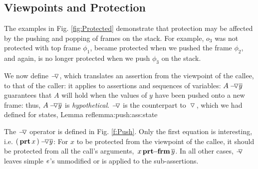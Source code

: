 { 
   
 \subsection{Viewpoints and Protection}
 
 
{The examples in Fig. \ref{fig:Protected} demonstrate that %
 protection may be affected by the pushing and popping of frames on the stack. For example, $o_3$ was not protected with top frame $\phi_1$,   became protected when we pushed the frame $\phi_2$,  and again, is no longer protected when we push $\phi_3$ on the stack. 
 
We now define 
$\pushSymbolAA$, which translates an assertion from the viewpoint of the callee, to that of the caller:
it applies to assertions and sequences of variables:  $\PushAS y A$   guarantees that $A$ will hold when the values of $y$ have been pushed onto a new frame:
 thus, $\PushAS y A$ is \emph{hypothetical}.
$\pushSymbolAA$ is the counterpart to $\pushSymbol$, which we had defined for states, \cf Lemma ref{lemma:push:ass:state}


The  $\pushSymbolAA$  operator is  defined in Fig. \ref{f:Push}. Only the first equation is interesting, i.e.  $\PushAS y {(\inside x)}$: For 
$x$ to be protected from the viewpoint of the callee, it should be protected from all the call's arguments,
\ie  $\protectedFrom x {\overline {y}}$. 
In all other cases,   $\pushSymbolA$  leaves simple $\re$'s unmodified %
 or is applied to the sub-assertions. %


}}
